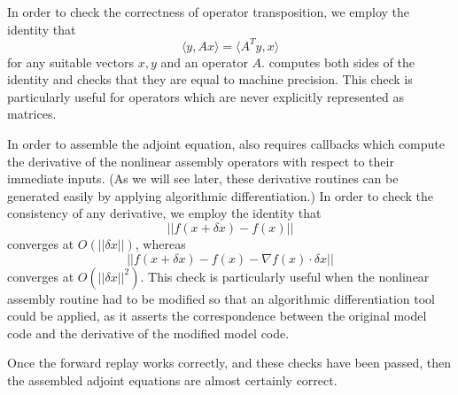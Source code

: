 \pagebreak[4]
In order to 
check the correctness of operator transposition, we employ the identity
that
\begin{equation*}
\langle y, Ax \rangle = \langle A^T y, x \rangle
\end{equation*}
for any suitable vectors $x, y$ and an operator $A$. \libadjoint computes both
sides of the identity and checks that they are equal to machine precision. This
check is particularly useful for operators which are never explicitly
represented as matrices.

In order to assemble the adjoint equation, \libadjoint also requires
callbacks which compute the derivative of the nonlinear assembly operators
with respect to their immediate inputs. (As we will see later, these
derivative routines can be generated easily by applying algorithmic
differentiation.) In order to check the consistency of any derivative,
we employ the identity that
\begin{equation*}
\left|\left| f(x + \delta x) - f(x) \right|\right|
\end{equation*}
converges at $O(\left|\left| \delta x \right|\right|)$, whereas
\begin{equation*}
\left|\left| f(x + \delta x) - f(x) - \nabla f(x)\cdot \delta x\right|\right|
\end{equation*}
converges at $O(\left|\left| \delta x \right|\right|^2)$. This check is
particularly useful when the nonlinear assembly routine had to be
modified so that an algorithmic differentiation tool could be applied,
as it asserts the correspondence between the original model code
and the derivative of the modified model code.

Once the forward replay works correctly, and these checks have been
passed, then the assembled adjoint equations are almost certainly correct.


